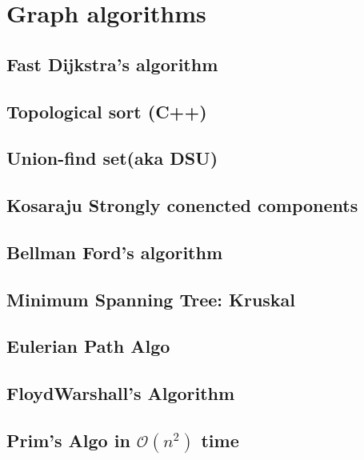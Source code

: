 \section{Graph algorithms}
\subsection{Fast Dijkstra's algorithm}
\raggedbottom
\hrulefill
\subsection{Topological sort (C++)}
\raggedbottom
\hrulefill
\subsection{Union-find set(aka DSU)}
\raggedbottom
\hrulefill
\subsection{Kosaraju Strongly conencted components}
\raggedbottom
\hrulefill
\subsection{Bellman Ford's algorithm}
\raggedbottom
\hrulefill
\subsection{Minimum Spanning Tree: Kruskal}
\raggedbottom
\hrulefill
\subsection{Eulerian Path Algo}
\raggedbottom
\hrulefill
\subsection{FloydWarshall's Algorithm}
\raggedbottom
\hrulefill
\subsection{Prim's Algo in $\mathcal{O}(n^2)$ time}
\raggedbottom
\hrulefill

